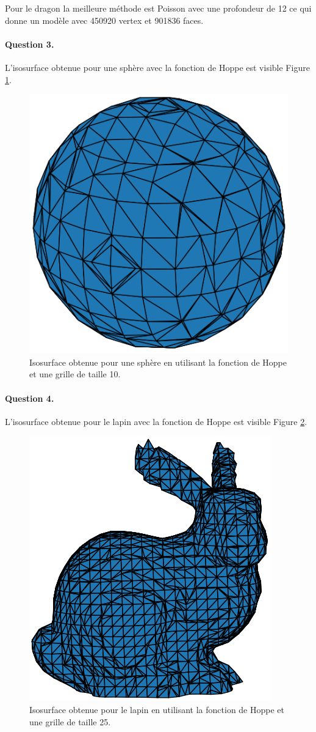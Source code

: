 \documentclass[french]{article}
\begin{document}
Pour le dragon la meilleure méthode est Poisson avec une profondeur de 12 ce qui donne un modèle avec 450920 vertex et 901836 faces.

\paragraph{Question 3.}
L'isosurface obtenue pour une sphère avec la fonction de Hoppe est visible Figure \ref{fig:shoppe}.
\begin{figure}[h]
	\centering
	\includegraphics[width=0.5\linewidth]{hoppe_sphere}
	\caption{Isosurface obtenue pour une sphère en utilisant la fonction de Hoppe et une grille de taille 10.}
	\label{fig:shoppe}
\end{figure}

\paragraph{Question 4.}
L'isosurface obtenue pour le lapin avec la fonction de Hoppe est visible Figure \ref{fig:bhoppe}.
\begin{figure}[h]
	\centering
	\includegraphics[width=0.5\linewidth]{bunnyhoppe}
	\caption{Isosurface obtenue pour le lapin en utilisant la fonction de Hoppe et une grille de taille 25.}
	\label{fig:bhoppe}
\end{figure}
\end{document}
